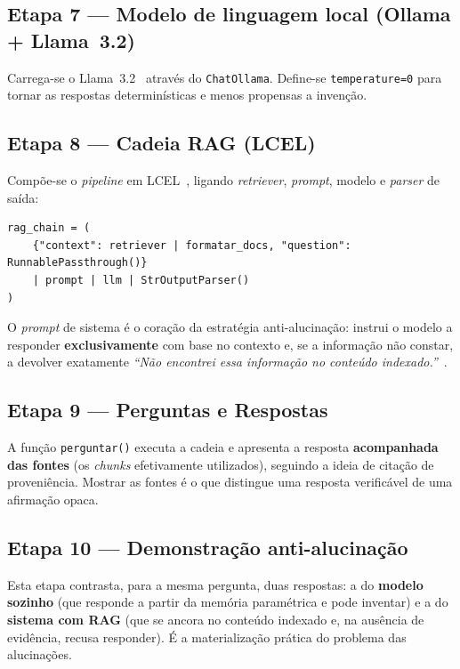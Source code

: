 \documentclass[]{ceurart}
\begin{document}
\subsection*{Etapa 7 --- Modelo de linguagem local (Ollama + Llama~3.2)}

Carrega-se o Llama~3.2~\cite{llama3} através do \texttt{ChatOllama}. Define-se \texttt{temperature=0} para tornar as respostas determinísticas e
menos propensas a invenção.

\subsection*{Etapa 8 --- Cadeia RAG (LCEL)}

Compõe-se o \emph{pipeline} em LCEL~\cite{langchain}, ligando \emph{retriever},
\emph{prompt}, modelo e \emph{parser} de saída:

\begin{lstlisting}
rag_chain = (
    {"context": retriever | formatar_docs, "question": RunnablePassthrough()}
    | prompt | llm | StrOutputParser()
)
\end{lstlisting}

O \emph{prompt} de sistema é o coração da estratégia anti-alucinação: instrui o
modelo a responder \textbf{exclusivamente} com base no contexto e, se a
informação não constar, a devolver exatamente \emph{``Não encontrei essa
informação no conteúdo indexado.''}~\cite{ji2023hallucination}.

\subsection*{Etapa 9 --- Perguntas e Respostas}

A função \texttt{perguntar()} executa a cadeia e apresenta a resposta
\textbf{acompanhada das fontes} (os \emph{chunks} efetivamente utilizados),
seguindo a ideia de citação de proveniência. Mostrar as fontes é o que distingue
uma resposta verificável de uma afirmação opaca.

\subsection*{Etapa 10 --- Demonstração anti-alucinação}

Esta etapa contrasta, para a mesma pergunta, duas respostas: a do \textbf{modelo
sozinho} (que responde a partir da memória paramétrica e pode inventar) e a do
\textbf{sistema com RAG} (que se ancora no conteúdo indexado e, na ausência de
evidência, recusa responder). É a materialização prática do problema das
alucinações.
\end{document}
